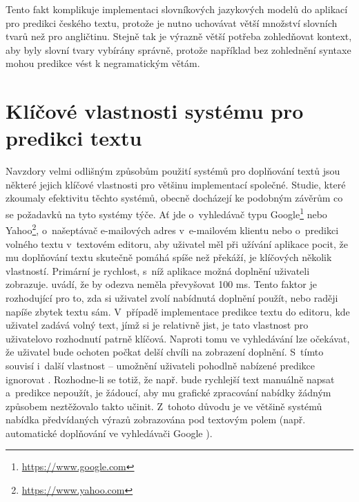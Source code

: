 \documentclass[a4paper,11pt,openany]{book} %
\begin{document}

Tento fakt komplikuje implementaci slovníkových jazykových modelů do aplikací pro predikci českého textu, protože je nutno uchovávat větší množství slovních tvarů než pro angličtinu. Stejně tak je výrazně větší potřeba zohledňovat kontext, aby byly slovní tvary vybírány správně, protože například bez zohlednění syntaxe mohou predikce vést k negramatickým větám. \parencite[5234--5235]{ghayoomi2009overview}

\chapter{Klíčové vlastnosti systému pro predikci textu}

Navzdory velmi odlišným způsobům použití systémů pro doplňování textů jsou některé jejich klíčové vlastnosti pro většinu implementací společné. Studie, které zkoumaly efektivitu těchto systémů, obecně docházejí ke podobným závěrům co se požadavků na tyto systémy týče. Ať jde o~vyhledávač typu Google\footnote{\url{https://www.google.com}} nebo Yahoo\footnote{\url{https://www.yahoo.com}}, o~našeptávač e-mailových adres v~e-mailovém klientu nebo o~predikci volného textu v~textovém editoru, aby uživatel měl při užívání aplikace pocit, že mu doplňování textu skutečně pomáhá spíše než překáží, je klíčových několik vlastností.  Primární je rychlost, s~níž aplikace možná doplnění uživateli zobrazuje. \parencite{nandi2007assisted} uvádí, že by odezva neměla převyšovat 100 ms. Tento faktor je rozhodující pro to, zda si uživatel zvolí nabídnutá doplnění použít, nebo raději napíše zbytek textu sám. V~případě implementace predikce textu do editoru, kde uživatel zadává volný text, jímž si je relativně jist, je tato vlastnost pro uživatelovo rozhodnutí patrně klíčová. Naproti tomu ve vyhledávání lze očekávat, že uživatel bude ochoten počkat delší chvíli na zobrazení doplnění. S~tímto souvisí i~další vlastnost -- umožnění uživateli pohodlně nabízené predikce ignorovat \parencite{ward2012autocomplete}. Rozhodne-li se totiž, že např. bude rychlejší text manuálně napsat a~predikce nepoužít, je žádoucí, aby mu grafické zpracování nabídky žádným způsobem neztěžovalo takto učinit. Z~tohoto důvodu je ve většině systémů nabídka předvídaných výrazů zobrazována pod textovým polem (např. automatické doplňování ve vyhledávači Google \parencite{google2015}). 
\end{document}
